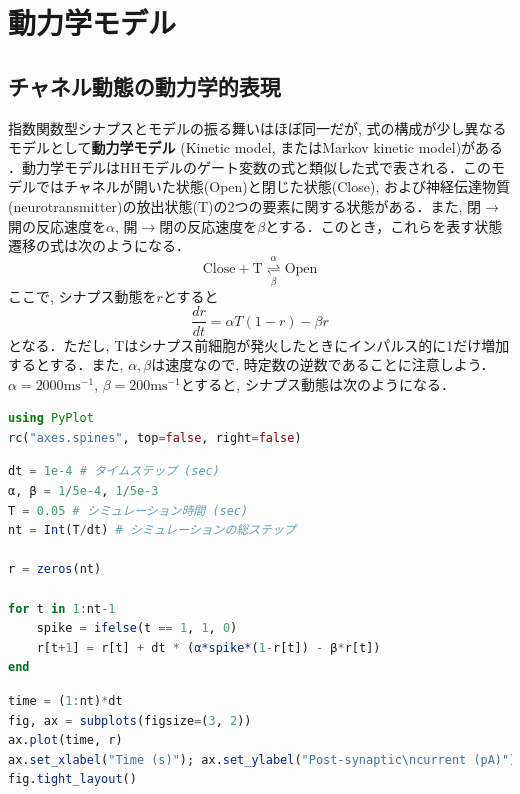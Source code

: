 \section{動力学モデル}
\subsection{チャネル動態の動力学的表現}
指数関数型シナプスとモデルの振る舞いはほぼ同一だが, 式の構成が少し異なるモデルとして\textbf{動力学モデル} (Kinetic model, またはMarkov kinetic model)がある \citep{Destexhe1994-ro}．動力学モデルはHHモデルのゲート変数の式と類似した式で表される．このモデルではチャネルが開いた状態(Open)と閉じた状態(Close), および神経伝達物質(neurotransmitter)の放出状態(T)の2つの要素に関する状態がある．また, 閉$\to$開の反応速度を$\alpha$, 開$\to$閉の反応速度を$\beta$とする．このとき，これらを表す状態遷移の式は次のようになる．
\begin{equation}
\text{Close}+\text{T}  \underset{\beta}{\overset{\alpha}{\rightleftharpoons}}\text{Open}    
\end{equation}
ここで, シナプス動態を$r$とすると
\begin{equation}
\frac{dr}{dt}=\alpha T (1-r) - \beta r
\end{equation}
となる．ただし, Tはシナプス前細胞が発火したときにインパルス的に1だけ増加するとする．また, $\alpha, \beta$は速度なので, 時定数の逆数であることに注意しよう． $\alpha=2000 \text{ms}^{-1}$, $\beta=200 \text{ms}^{-1}$とすると, シナプス動態は次のようになる．
\begin{lstlisting}[language=julia]
using PyPlot
rc("axes.spines", top=false, right=false)
\end{lstlisting}
\begin{lstlisting}[language=julia]
dt = 1e-4 # タイムステップ (sec)
α, β = 1/5e-4, 1/5e-3
T = 0.05 # シミュレーション時間 (sec)
nt = Int(T/dt) # シミュレーションの総ステップ

r = zeros(nt)

for t in 1:nt-1
    spike = ifelse(t == 1, 1, 0)
    r[t+1] = r[t] + dt * (α*spike*(1-r[t]) - β*r[t])
end
\end{lstlisting}
\begin{lstlisting}[language=julia]
time = (1:nt)*dt
fig, ax = subplots(figsize=(3, 2))
ax.plot(time, r)
ax.set_xlabel("Time (s)"); ax.set_ylabel("Post-synaptic\ncurrent (pA)")
fig.tight_layout()
\end{lstlisting}
